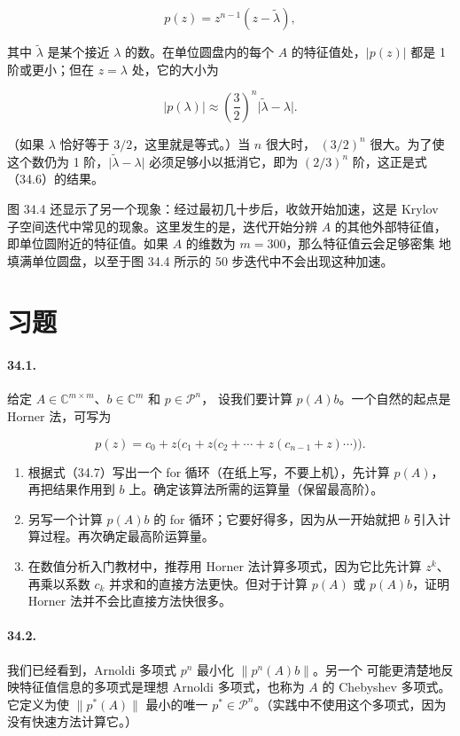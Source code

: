 \documentclass[UTF8,fontset=none,12pt]{ctexart}
\begin{document}
\[
p(z)=z^{n-1}(z-\widetilde\lambda),
\]

其中 $\widetilde\lambda$ 是某个接近 $\lambda$ 的数。在单位圆盘内的每个
$A$ 的特征值处，$\lvert p(z)\rvert$ 都是 1 阶或更小；但在 $z=\lambda$
处，它的大小为

\[
\lvert p(\lambda)\rvert\approx
\left(\frac32\right)^n\lvert\widetilde\lambda-\lambda\rvert.
\]

（如果 $\lambda$ 恰好等于 $3/2$，这里就是等式。）当 $n$ 很大时，
$(3/2)^n$ 很大。为了使这个数仍为 1 阶，$\lvert\widetilde\lambda-\lambda\rvert$
必须足够小以抵消它，即为 $(2/3)^n$ 阶，这正是式（34.6）的结果。

图 34.4 还显示了另一个现象：经过最初几十步后，收敛开始加速，这是 Krylov
子空间迭代中常见的现象。这里发生的是，迭代开始分辨 $A$ 的其他外部特征值，
即单位圆附近的特征值。如果 $A$ 的维数为 $m=300$，那么特征值云会足够密集
地填满单位圆盘，以至于图 34.4 所示的 50 步迭代中不会出现这种加速。

\section*{习题}

\paragraph{34.1.}
给定 $A\in\mathbb C^{m\times m}$、$b\in\mathbb C^m$ 和 $p\in\mathcal P^n$，
设我们要计算 $p(A)b$。一个自然的起点是 Horner 法，可写为

\begin{equation}
p(z)=c_0+z\bigl(c_1+z\bigl(c_2+\cdots+z(c_{n-1}+z)\cdots\bigr)\bigr).
\tag{34.7}
\end{equation}

\begin{enumerate}[label=(\alph*)]
\item 根据式（34.7）写出一个 for 循环（在纸上写，不要上机），先计算 $p(A)$，
再把结果作用到 $b$ 上。确定该算法所需的运算量（保留最高阶）。
\item 另写一个计算 $p(A)b$ 的 for 循环；它要好得多，因为从一开始就把 $b$
引入计算过程。再次确定最高阶运算量。
\item 在数值分析入门教材中，推荐用 Horner 法计算多项式，因为它比先计算
$z^k$、再乘以系数 $c_k$ 并求和的直接方法更快。但对于计算 $p(A)$ 或
$p(A)b$，证明 Horner 法并不会比直接方法快很多。
\end{enumerate}

\paragraph{34.2.}
我们已经看到，Arnoldi 多项式 $p^n$ 最小化 $\lVert p^n(A)b\rVert$。另一个
可能更清楚地反映特征值信息的多项式是理想 Arnoldi 多项式，也称为 $A$ 的
Chebyshev 多项式。它定义为使 $\lVert p^*(A)\rVert$ 最小的唯一
$p^*\in\mathcal P^n$。（实践中不使用这个多项式，因为没有快速方法计算它。）
\end{document}
